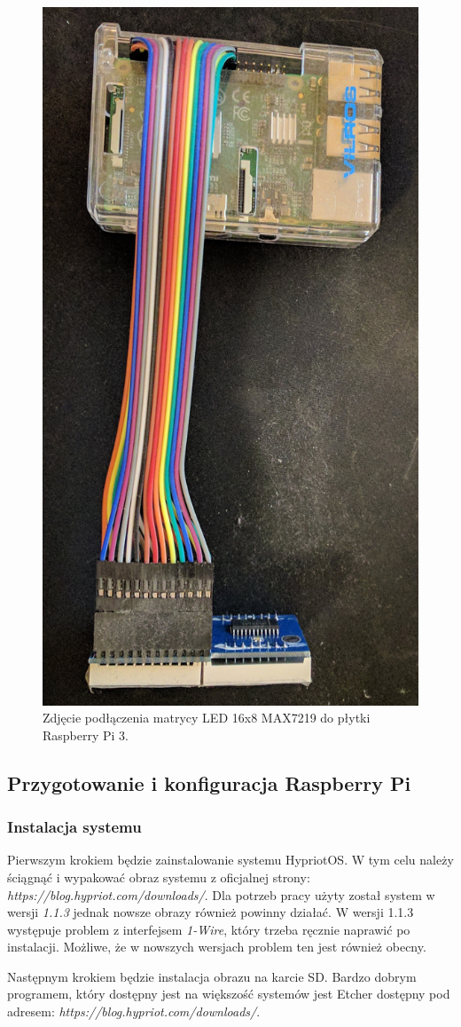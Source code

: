 \documentclass[12pt]{report}
\let\Oldsubsection\subsection
\renewcommand{\subsection}{\FloatBarrier\Oldsubsection}
\let\Oldsubsubsection\subsubsection
\renewcommand{\subsubsection}{\FloatBarrier\Oldsubsubsection}
\begin{document}
{\begin{figure}[h]
	\centering
	\includegraphics[height=1\textwidth]{images/rpi-node.jpg}
	\caption{Zdjęcie podłączenia matrycy LED 16x8 MAX7219 do płytki Raspberry Pi 3.}
\end{figure}
\FloatBarrier	
\subsection{Przygotowanie i konfiguracja Raspberry Pi}
\subsubsection{Instalacja systemu}
Pierwszym krokiem będzie zainstalowanie systemu HypriotOS. W tym celu należy ściągnąć i wypakować obraz systemu z oficjalnej strony: \textit{https://blog.hypriot.com/downloads/}. Dla potrzeb pracy użyty został system w wersji \textit{1.1.3} jednak nowsze obrazy również powinny działać. W wersji 1.1.3 występuje problem z interfejsem \textit{1-Wire}, który trzeba ręcznie naprawić po instalacji. Możliwe, że w nowszych wersjach problem ten jest również obecny.

Następnym krokiem będzie instalacja obrazu na karcie SD. Bardzo dobrym programem, który dostępny jest na większość systemów jest Etcher dostępny pod adresem: \textit{https://blog.hypriot.com/downloads/}.

}
\end{document}

